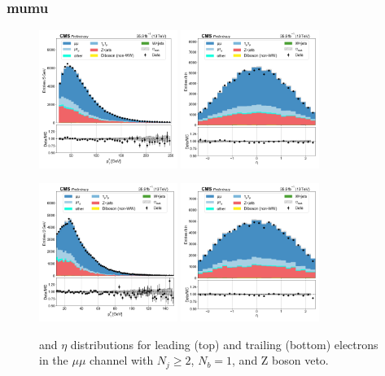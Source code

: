 \subsubsection{mumu}
\begin{figure}[htb!]
    \centering
    \includegraphics[width=0.4\textwidth]{chapters/Appendix/sectionPlots/figures/data_mc_overlays/mumu_2016_cat_gt2_eq1_b_signal_linear_lepton_lepton1_pt}
    \includegraphics[width=0.4\textwidth]{chapters/Appendix/sectionPlots/figures/data_mc_overlays/mumu_2016_cat_gt2_eq1_b_signal_linear_lepton_lepton1_eta}

    \includegraphics[width=0.4\textwidth]{chapters/Appendix/sectionPlots/figures/data_mc_overlays/mumu_2016_cat_gt2_eq1_b_signal_linear_lepton_lepton2_pt}
    \includegraphics[width=0.4\textwidth]{chapters/Appendix/sectionPlots/figures/data_mc_overlays/mumu_2016_cat_gt2_eq1_b_signal_linear_lepton_lepton2_eta}
    \caption{\pt and $\eta$ distributions for leading (top) and trailing
    (bottom) electrons in the $\mu\mu$ channel with $N_{j} \geq 2$, $N_{b}
    = 1$, and Z boson veto.}
    \label{fig:mumu_1_kinematic}
\end{figure}

